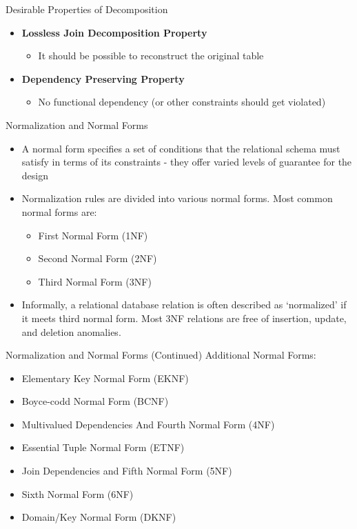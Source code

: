 \documentclass[aspectratio=169, xcolor=dvipsnames]{beamer}
\begin{document}
\begin{frame}{Desirable Properties of Decomposition}
    \begin{itemize}[<+->]
        \item \textbf{Lossless Join Decomposition Property}
        \begin{itemize}
            \item[$\triangleright$] It should be possible to reconstruct the original table
        \end{itemize}
        \item \textbf{Dependency Preserving Property}
        \begin{itemize}
            \item[$\triangleright$] No functional dependency (or other constraints should get violated)
        \end{itemize}
    \end{itemize}
\end{frame}

\begin{frame}{Normalization and Normal Forms}
    \begin{itemize}[<+->]
        \item A normal form specifies a set of conditions that the relational schema must satisfy in terms of its constraints - they offer varied levels of guarantee for the design
        \item Normalization rules are divided into various normal forms. Most common normal forms are:
        \begin{itemize}
            \item[$\triangleright$] First Normal Form (1NF)
            \item[$\triangleright$] Second Normal Form (2NF)
            \item[$\triangleright$] Third Normal Form (3NF)
        \end{itemize}
        \item Informally, a relational database relation is often described as `normalized' if it meets third normal form. Most 3NF relations are free of insertion, update, and deletion anomalies.
    \end{itemize}
\end{frame}

\begin{frame}{Normalization and Normal Forms (Continued)}
    Additional Normal Forms:
    \begin{itemize}[<+->]
        \item Elementary Key Normal Form (EKNF)
        \item Boyce-codd Normal Form (BCNF)
        \item Multivalued Dependencies And Fourth Normal Form (4NF)
        \item Essential Tuple Normal Form (ETNF)
        \item Join Dependencies and Fifth Normal Form (5NF)
        \item Sixth Normal Form (6NF)
        \item Domain/Key Normal Form (DKNF)
    \end{itemize}
\end{frame}
\end{document}
